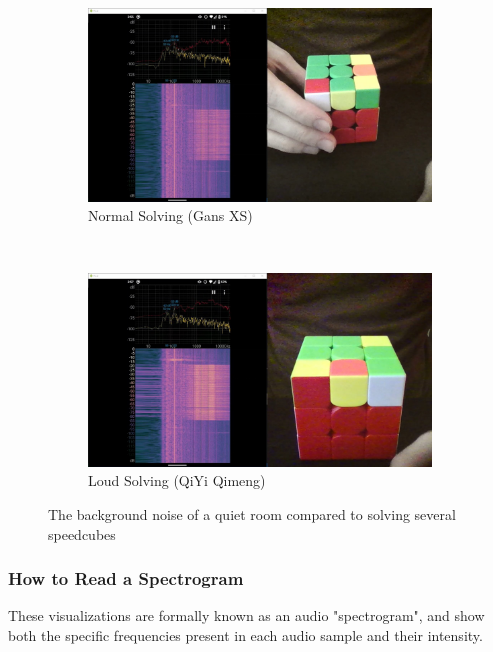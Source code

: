 \begin{figure}\ContinuedFloat
    \centering
    \begin{subfigure}{\textwidth}
        \centering
        \includegraphics[width=\linewidth]{Figures/4 Protocol Design/Signal to Noise Ratio/xs_background_noise.jpg}
        \caption{Normal Solving (Gans XS)}
        \label{fig:signal-to-noise-ratio-xs}
    \end{subfigure}\\
    \begin{subfigure}{\textwidth}
        \centering
        \includegraphics[width=\linewidth]{Figures/4 Protocol Design/Signal to Noise Ratio/qiyi_background_noise.jpg}
        \caption{Loud Solving (QiYi Qimeng)}
        \label{fig:signal-to-noise-ratio-qiyi}
    \end{subfigure}%
    \caption{The background noise of a quiet room compared to solving several speedcubes}
    \label{fig:signal-to-noise-ratio}
\end{figure}

\subsubsection{How to Read a Spectrogram}
\label{subsubsec:how-to-read-a-spectrogram}
These visualizations are formally known as an audio "spectrogram", and show both the specific frequencies present in each audio sample and their intensity.

